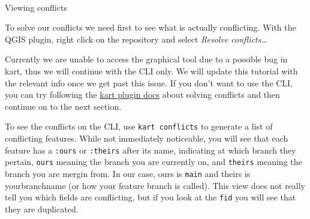 \documentclass[
  letterpaper,
  DIV=11,
  numbers=noendperiod]{scrartcl}
\makeatletter
\let\oldparagraph\paragraph
\renewcommand{\paragraph}{
    \@ifstar
      \xxxParagraphStar
      \xxxParagraphNoStar
  }
\newcommand{\xxxParagraphStar}[1]{\oldparagraph*{#1}\mbox{}}
\newcommand{\xxxParagraphNoStar}[1]{\oldparagraph{#1}\mbox{}}
\makeatother
\begin{document}
\paragraph{Viewing conflicts}\label{viewing-conflicts}

To solve our conflicts we need first to see what is actually
conflicting. With the QGIS plugin, right click on the repository and
select \emph{Resolve conflicts\ldots{}}

\begin{tcolorbox}[enhanced jigsaw, colframe=quarto-callout-note-color-frame, colbacktitle=quarto-callout-note-color!10!white, rightrule=.15mm, opacitybacktitle=0.6, opacityback=0, bottomrule=.15mm, coltitle=black, title=\textcolor{quarto-callout-note-color}{\faInfo}\hspace{0.5em}{Note}, left=2mm, bottomtitle=1mm, toptitle=1mm, toprule=.15mm, breakable, titlerule=0mm, colback=white, leftrule=.75mm, arc=.35mm]

Currently we are unable to access the graphical tool due to a possible
bug in kart, thus we will continue with the CLI only. We will update
this tutorial with the relevant info once we get past this issue. If you
don't want to use the CLI, you can try following the
\href{https://github.com/koordinates/kart-qgis-plugin/blob/main/docs/index.md\#working-with-branches}{kart
plugin docs} about solving conflicts and then continue on to the next
section.

\end{tcolorbox}

To see the conflicts on the CLI, use \texttt{kart\ conflicts} to
generate a list of conflicting features. While not immediately
noticeable, you will see that each feature has a \texttt{:ours} or
\texttt{:theirs} after its name, indicating at which branch they
pertain, \texttt{ours} meaning the branch you are currently on, and
\texttt{theirs} meaning the branch you are mergin from. In our case,
ours is \texttt{main} and theirs is yourbranchname (or how your feature
branch is called). This view does not really tell you which fields are
conflicting, but if you look at the \texttt{fid} you will see that they
are duplicated.
\end{document}
